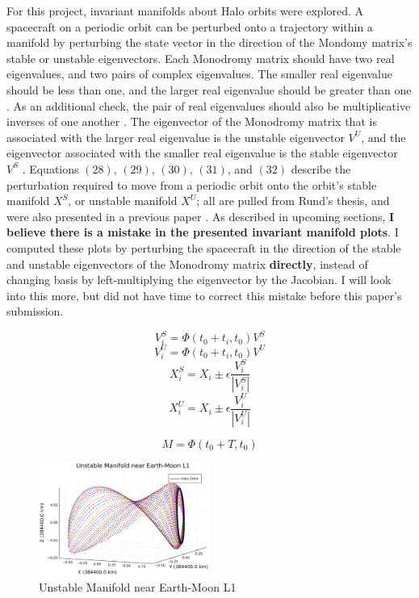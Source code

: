 \documentclass[conf]{new-aiaa}
\begin{document}
\begin{multicols*}{2}
For this project, invariant manifolds about Halo orbits were 
explored. A spacecraft on a periodic orbit can be perturbed 
onto a trajectory within a manifold by perturbing the 
state vector in the direction of the Mondomy matrix's stable 
or unstable eigenvectors. Each Monodromy matrix should have 
two real eigenvalues, and two pairs of complex eigenvalues.
The smaller real eigenvalue should be less than one,
and the larger real eigenvalue should be greater than one 
\cite{gomez2001dynamicsv1}. As an additional check, 
the pair of real eigenvalues should also be multiplicative 
inverses of one another \cite{mirelesNotes}. The eigenvector 
of the Monodromy matrix that is associated with the 
larger real eigenvalue is the unstable eigenvector $V^U$, and 
the eigenvector associated with the smaller real eigenvalue is 
the stable eigenvector $V^S$ \cite{rund2018interplanetary}.
Equations $(28)$, $(29)$, $(30)$, $(31)$, and $(32)$ describe 
the perturbation required to move from a periodic orbit 
onto the orbit's stable manifold $X^S$, or unstable manifold $X^U$;
all are pulled from Rund's thesis, and were also presented 
in a previous paper \cite{rund2018interplanetary} \cite{carpinelli2020halos}.
As described in upcoming sections, \textbf{I believe there is a mistake 
in the presented invariant manifold plots}. I computed these plots by 
perturbing the spacecraft in the direction of the stable and 
unstable eigenvectors of the Monodromy matrix \textbf{directly}, instead of 
changing basis by left-multiplying the eigenvector by the Jacobian. I will 
look into this more, but did not have time to correct this mistake before 
this paper's submission.

\begin{equation}
    V_i^{S} = \Phi(t_0 + t_i, t_0) V^S
\end{equation}
\begin{equation}
    V_i^{U} = \Phi(t_0 + t_i, t_0) V^U
\end{equation}
\begin{equation}
    X_i^{S} = X_i \pm \epsilon \frac{V_i^S}{|V_i^S|}
\end{equation}
\begin{equation}
    X_i^{U} = X_i \pm \epsilon \frac{V_i^U}{|V_i^U|}
\end{equation}

\begin{equation}
M = \Phi(t_0 + T, t_0)
\end{equation}

\begin{figure}[H]
    \hskip -0.3cm
    \includegraphics[width=0.5\textwidth]{unstable_manifold.png}
    \caption{Unstable Manifold near Earth-Moon L1}
\end{figure}


\end{multicols*}
\end{document}
